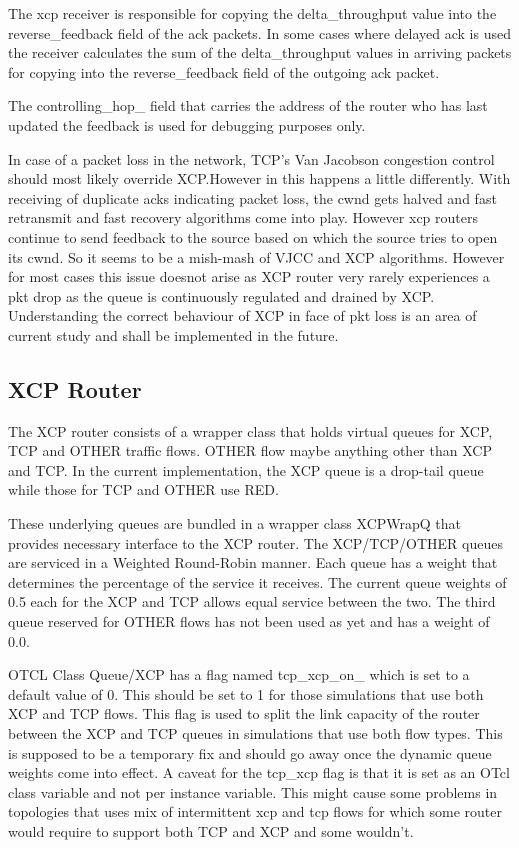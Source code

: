     The xcp receiver is responsible for copying the delta\_throughput
    value into the reverse\_feedback field of the ack packets. In some
    cases where delayed ack is used the receiver calculates the sum of
    the delta\_throughput values in arriving packets for copying into the
    reverse\_feedback field of the outgoing ack packet.

    The controlling\_hop\_ field that carries the address of the router
    who has last updated the feedback is used for debugging purposes only.

    In case of a packet loss in the network, TCP's Van Jacobson
    congestion control should most likely override XCP.However in \ns
    this happens 
    a little differently. With receiving of duplicate acks indicating
    packet loss, the cwnd gets halved and fast retransmit and fast
    recovery algorithms come into play. However xcp routers continue to send
    feedback to the source based on which the source tries to open its
    cwnd. So it seems to be a mish-mash of VJCC and XCP
    algorithms. However for most cases this issue doesnot arise as XCP
    router very rarely experiences a pkt drop as the queue is
    continuously regulated and drained by XCP. Understanding the correct
    behaviour of XCP in face of pkt loss is an area of current study and
    shall be implemented in the future. 

    \subsection{XCP Router}
    \label {sec:xcp_wrapper}
    The XCP router consists of a wrapper class that holds virtual queues
    for XCP, TCP and OTHER traffic flows. OTHER flow maybe anything other
    than XCP and TCP. In the current implementation, the XCP queue is a
    drop-tail queue while those for TCP and OTHER use RED. 

    These underlying queues are bundled in a
    wrapper class XCPWrapQ that provides necessary interface to the XCP
    router. The XCP/TCP/OTHER queues are serviced in a Weighted Round-Robin
    manner. Each queue has a weight that determines the percentage of the
    service it receives. The current queue weights of 0.5 each for the XCP
    and TCP allows equal service between the two. The third queue reserved
    for OTHER flows has not been used as yet and has a weight of 0.0. 
    
    OTCL Class Queue/XCP has a flag named tcp\_xcp\_on\_ which is set to
    a default 
    value of 0. This should be set to 1 for those simulations that use
    both XCP and TCP flows. This flag is used to split the link capacity
    of the router between the XCP and TCP queues in simulations that
    use both flow types. This is supposed to be a temporary fix and
    should go away once the dynamic queue weights come into effect. A
    caveat for the tcp\_xcp flag is that it is set as an OTcl class variable
    and not per instance variable. This might cause some 
    problems in topologies that uses mix of intermittent xcp and tcp
    flows for which some router would require to support both TCP and
    XCP and some wouldn't.
    
